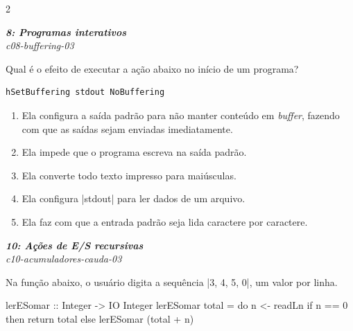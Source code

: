 \documentclass[a4paper,10pt,brazil]{article}
\begin{document}
\begin{multicols}{2}
\begin{flushright}
  \footnotesize
  \textit{\textbf{8: Programas interativos}}\\
  \textit{c08-buffering-03}\\

\end{flushright}
Qual é o efeito de executar a ação abaixo no início de um programa?

\begin{verbatim}
hSetBuffering stdout NoBuffering
\end{verbatim}

\begin{enumerate}
  \item Ela configura a saída padrão para não manter conteúdo em \emph{buffer}, fazendo com que as saídas sejam enviadas imediatamente.

  \item Ela impede que o programa escreva na saída padrão.

  \item Ela converte todo texto impresso para maiúsculas.

  \item Ela configura \haskellinline|stdout| para ler dados de um arquivo.

  \item Ela faz com que a entrada padrão seja lida caractere por caractere.


\end{enumerate}

\begin{flushright}
  \footnotesize
  \textit{\textbf{10: Ações de E/S recursivas}}\\
  \textit{c10-acumuladores-cauda-03}\\

\end{flushright}
Na função abaixo, o usuário digita a sequência \haskellinline|3, 4, 5, 0|, um valor por linha.

\begin{haskellcode}
lerESomar :: Integer -> IO Integer
lerESomar total = do
  n <- readLn
  if n == 0
    then return total
    else lerESomar (total + n)
\end{haskellcode}


\end{multicols}
\end{document}
